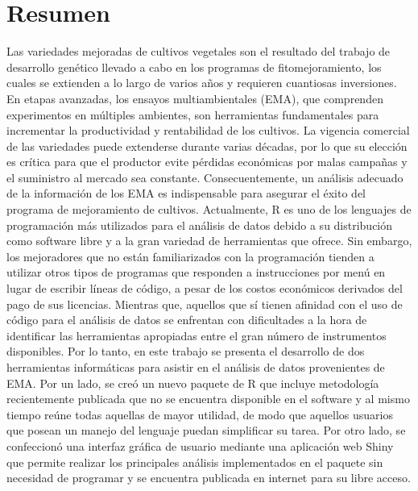 
\chapter*{Resumen}

Las variedades mejoradas de cultivos vegetales son el resultado del trabajo de desarrollo genético llevado a cabo en los programas de fitomejoramiento, los cuales se extienden a lo largo de varios años y requieren cuantiosas inversiones. En etapas avanzadas, los ensayos multiambientales (EMA), que comprenden experimentos en múltiples ambientes, son herramientas fundamentales para incrementar la productividad y rentabilidad de los cultivos. La vigencia comercial de las variedades puede extenderse durante varias décadas, por lo que su elección es crítica para que el productor evite pérdidas económicas por malas campañas y el suministro al mercado sea constante. Consecuentemente, un análisis adecuado de la información de los EMA es indispensable para asegurar el éxito del programa de mejoramiento de cultivos. Actualmente, R es uno de los lenguajes de programación más utilizados para el análisis de datos debido a su distribución como software libre y a la gran variedad de herramientas que ofrece. Sin embargo, los mejoradores que no están familiarizados con la programación tienden a utilizar otros tipos de programas que responden a instrucciones por menú en lugar de escribir líneas de código, a pesar de los costos económicos derivados del pago de sus licencias. Mientras que, aquellos que sí tienen afinidad con el uso de código para el análisis de datos se enfrentan con dificultades a la hora de identificar las herramientas apropiadas entre el gran número de instrumentos disponibles. Por lo tanto, en este trabajo se presenta el desarrollo de dos herramientas informáticas para asistir en el análisis de datos provenientes de EMA. Por un lado, se creó un nuevo paquete de R que incluye metodología recientemente publicada que no se encuentra disponible en el software y al mismo tiempo reúne todas aquellas de mayor utilidad, de modo que aquellos usuarios que posean un manejo del lenguaje puedan simplificar su tarea. Por otro lado, se confeccionó una interfaz gráfica de usuario mediante una aplicación web Shiny que permite realizar los principales análisis implementados en el paquete sin necesidad de programar y se encuentra publicada en internet para su libre acceso.


